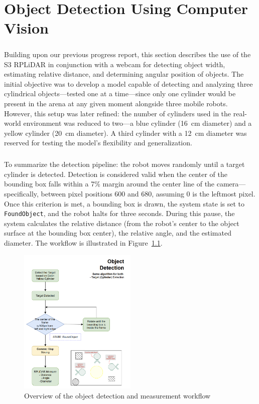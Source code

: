 \chapter{Object Detection Using Computer Vision}

\paragraph*{}
Building upon our previous progress report, this section describes the use of the S3 RPLiDAR in conjunction with a webcam for detecting object width, estimating relative distance, and determining angular position of objects. The initial objective was to develop a model capable of detecting and analyzing three cylindrical objects—tested one at a time—since only one cylinder would be present in the arena at any given moment alongside three mobile robots. However, this setup was later refined: the number of cylinders used in the real-world environment was reduced to two—a blue cylinder (16~cm diameter) and a yellow cylinder (20~cm diameter). A third cylinder with a 12~cm diameter was reserved for testing the model's flexibility and generalization.

\paragraph*{}
To summarize the detection pipeline: the robot moves randomly until a target cylinder is detected. Detection is considered valid when the center of the bounding box falls within a 7\% margin around the center line of the camera—specifically, between pixel positions 600 and 680, assuming 0 is the leftmost pixel. Once this criterion is met, a bounding box is drawn, the system state is set to \texttt{FoundObject}, and the robot halts for three seconds. During this pause, the system calculates the relative distance (from the robot’s center to the object surface at the bounding box center), the relative angle, and the estimated diameter. The workflow is illustrated in Figure~\ref{fig:workflow}.

\begin{figure}[H]
    \centering
    \includegraphics[width=0.5\textwidth]{assets/images/object_detection/fig1.png}
    \caption{Overview of the object detection and measurement workflow}
    \label{fig:workflow}
\end{figure}

